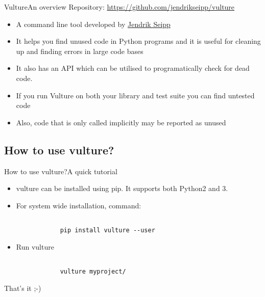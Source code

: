 \documentclass{beamer}
\begin{document}
\begin{frame}{Vulture}{An overview}
Repository: \url{https://github.com/jendrikseipp/vulture}

\begin{itemize}
    \item
    A command line tool developed by \href{https://github.com/jendrikseipp}{Jendrik Seipp}
        \pause
    \item
    It helps you find unused code in Python programs and it is useful for 
    cleaning up and finding errors in large code bases
        \pause
    \item It also has an API which can be utilised to programatically check for dead code.
        \pause
    \item
    If you run Vulture on both your library and test suite you can find untested code
        \pause
    \item
    Also, code that is only called implicitly may be reported as unused
\end{itemize}
\end{frame}

\subsection{How to use vulture?}

\begin{frame}{How to use vulture?}{A quick tutorial}

\begin{itemize}
    \item{
        vulture can be installed using pip. It supports both Python2 and 3.
    }
    \pause
    \item{
        For system wide installation, command:
        \begin{verbatim}

            pip install vulture --user

        \end{verbatim}
        \pause
    }
    \item{
        Run vulture
        \begin{verbatim}

            vulture myproject/

        \end{verbatim}
        \pause
    }
\end{itemize}

That's it ;-)
\end{frame}
\end{document}
